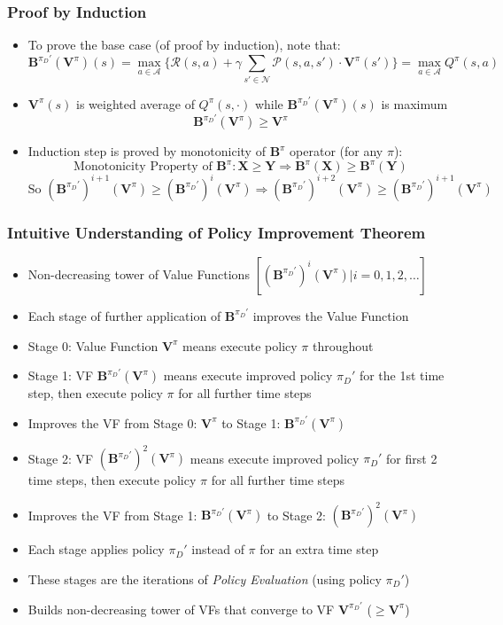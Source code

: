 \documentclass[handout]{beamer}
\newcommand{\bvpi}{\bm{V}^{\pi}}
\begin{document}
\begin{frame}
\frametitle{Proof by Induction}
\pause
\begin{itemize}[<+->]
\item To prove the base case (of proof by induction), note that:
$$\bm{B}^{\pi_D'}(\bvpi)(s) = \max_{a \in \mathcal{A}} \{\mathcal{R}(s,a) + \gamma \sum_{s' \in \mathcal{N}} \mathcal{P}(s,a,s') \cdot \bvpi(s')\} = \max_{a \in \mathcal{A}} Q^{\pi}(s,a)$$
\item $\bvpi(s)$ is weighted average of $Q^{\pi}(s,\cdot)$ while $\bm{B}^{\pi_D'}(\bvpi)(s)$ is maximum
$$\bm{B}^{\pi_D'}(\bvpi) \geq \bvpi$$
\item Induction step is proved by monotonicity of $\bm{B}^{\pi}$ operator (for any $\pi$):
$$\text{Monotonicity Property of } \bm{B}^{\pi}: \bm{X} \geq \bm{Y} \Rightarrow \bm{B}^{\pi}(\bm{X}) \geq \bm{B}^{\pi}(\bm{Y})$$
$$\text{So } (\bm{B}^{\pi_D'})^{i+1}(\bvpi) \geq (\bm{B}^{\pi_D'})^i(\bvpi) \Rightarrow (\bm{B}^{\pi_D'})^{i+2}(\bvpi) \geq (\bm{B}^{\pi_D'})^{i+1}(\bvpi)$$
\end{itemize}
\end{frame}


\begin{frame}
\frametitle{Intuitive Understanding of Policy Improvement Theorem}
\pause
\begin{itemize}[<+->]	
\item Non-decreasing tower of Value Functions $[(\bm{B}^{\pi_D'})^i(\bvpi)|i = 0, 1, 2, \ldots]$
\item Each stage of further application of $\bm{B}^{\pi_D'}$ improves the Value Function
\item Stage 0:  Value Function $\bvpi$ means execute policy $\pi$ throughout
\item Stage 1: VF $\bm{B}^{\pi_D'}(\bvpi)$ means execute improved policy $\pi_D'$ for the 1st time step, then execute policy $\pi$ for all further time steps
\item Improves the VF from Stage 0: $\bvpi$ to Stage 1: $\bm{B}^{\pi_D'}(\bvpi)$
\item Stage 2: VF $(\bm{B}^{\pi_D'})^2(\bvpi)$ means execute improved policy $\pi_D'$ for first 2 time steps, then execute policy $\pi$ for all further time steps
\item Improves the VF from Stage 1: $\bm{B}^{\pi_D'}(\bvpi)$ to Stage 2: $(\bm{B}^{\pi_D'})^2(\bvpi)$
\item Each stage applies policy $\pi_D'$ instead of $\pi$ for an extra time step
\item These stages are the iterations of {\em Policy Evaluation} (using policy $\pi_D'$)
\item Builds non-decreasing tower of VFs that converge to VF $\bm{V}^{\pi_D'}$ ($\geq \bvpi$)
\end{itemize}
\end{frame}
\end{document}
